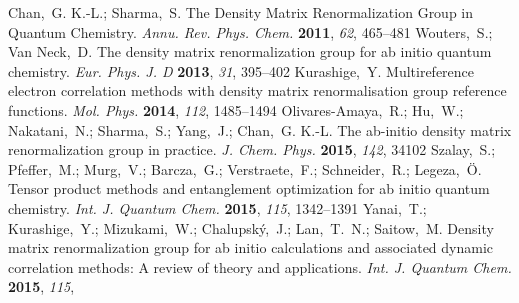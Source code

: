 \documentclass[journal=jctcce]{achemso}
\begin{document}
\begin{mcitethebibliography}{79}
{\mcitedefaultendpunct}{\mcitedefaultseppunct}\relax
\EndOfBibitem
{}
Chan,~G. K.-L.; Sharma,~S. {The Density Matrix Renormalization Group in Quantum
  Chemistry}. \emph{Annu. Rev. Phys. Chem.} \textbf{2011}, \emph{62},
  465--481\relax
\mciteBstWouldAddEndPuncttrue
\mciteSetBstMidEndSepPunct{\mcitedefaultmidpunct}
{\mcitedefaultendpunct}{\mcitedefaultseppunct}\relax
\EndOfBibitem
{}
Wouters,~S.; {Van Neck},~D. {The density matrix renormalization group for ab
  initio quantum chemistry}. \emph{Eur. Phys. J. D} \textbf{2013}, \emph{31},
  395--402\relax
\mciteBstWouldAddEndPuncttrue
\mciteSetBstMidEndSepPunct{\mcitedefaultmidpunct}
{\mcitedefaultendpunct}{\mcitedefaultseppunct}\relax
\EndOfBibitem
{}
Kurashige,~Y. {Multireference electron correlation methods with density matrix
  renormalisation group reference functions}. \emph{Mol. Phys.} \textbf{2014},
  \emph{112}, 1485--1494\relax
\mciteBstWouldAddEndPuncttrue
\mciteSetBstMidEndSepPunct{\mcitedefaultmidpunct}
{\mcitedefaultendpunct}{\mcitedefaultseppunct}\relax
\EndOfBibitem
{}
Olivares-Amaya,~R.; Hu,~W.; Nakatani,~N.; Sharma,~S.; Yang,~J.; Chan,~G. K.-L.
  {The ab-initio density matrix renormalization group in practice}. \emph{J.
  Chem. Phys.} \textbf{2015}, \emph{142}, 34102\relax
\mciteBstWouldAddEndPuncttrue
\mciteSetBstMidEndSepPunct{\mcitedefaultmidpunct}
{\mcitedefaultendpunct}{\mcitedefaultseppunct}\relax
\EndOfBibitem
{}
Szalay,~S.; Pfeffer,~M.; Murg,~V.; Barcza,~G.; Verstraete,~F.; Schneider,~R.;
  Legeza,~{\"{O}}. {Tensor product methods and entanglement optimization for ab
  initio quantum chemistry}. \emph{Int. J. Quantum Chem.} \textbf{2015},
  \emph{115}, 1342--1391\relax
\mciteBstWouldAddEndPuncttrue
\mciteSetBstMidEndSepPunct{\mcitedefaultmidpunct}
{\mcitedefaultendpunct}{\mcitedefaultseppunct}\relax
\EndOfBibitem
{}
Yanai,~T.; Kurashige,~Y.; Mizukami,~W.; Chalupsk{\'{y}},~J.; Lan,~T.~N.;
  Saitow,~M. {Density matrix renormalization group for ab initio calculations
  and associated dynamic correlation methods: A review of theory and
  applications}. \emph{Int. J. Quantum Chem.} \textbf{2015}, \emph{115},

\end{mcitethebibliography}
\end{document}
